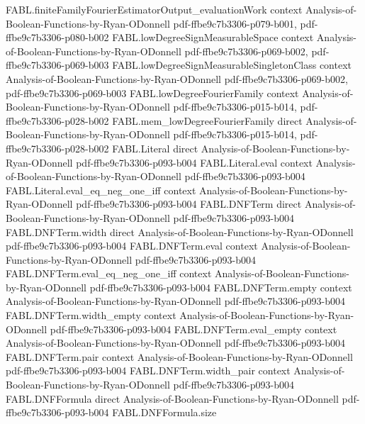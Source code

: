 \begin{theorem}
  {FABL.finiteFamilyFourierEstimatorOutput_evaluationWork}
  {context}
  {Analysis-of-Boolean-Functions-by-Ryan-ODonnell}
  {pdf-ffbe9c7b3306-p079-b001,
    pdf-ffbe9c7b3306-p080-b002}
\proofstep
  {FABL.lowDegreeSignMeasurableSpace}
  {context}
  {Analysis-of-Boolean-Functions-by-Ryan-ODonnell}
  {pdf-ffbe9c7b3306-p069-b002,
    pdf-ffbe9c7b3306-p069-b003}
\proofstep
  {FABL.lowDegreeSignMeasurableSingletonClass}
  {context}
  {Analysis-of-Boolean-Functions-by-Ryan-ODonnell}
  {pdf-ffbe9c7b3306-p069-b002,
    pdf-ffbe9c7b3306-p069-b003}
\proofstep
  {FABL.lowDegreeFourierFamily}
  {context}
  {Analysis-of-Boolean-Functions-by-Ryan-ODonnell}
  {pdf-ffbe9c7b3306-p015-b014,
    pdf-ffbe9c7b3306-p028-b002}
\proofstep
  {FABL.mem_lowDegreeFourierFamily}
  {direct}
  {Analysis-of-Boolean-Functions-by-Ryan-ODonnell}
  {pdf-ffbe9c7b3306-p015-b014,
    pdf-ffbe9c7b3306-p028-b002}
\proofstep
  {FABL.Literal}
  {direct}
  {Analysis-of-Boolean-Functions-by-Ryan-ODonnell}
  {pdf-ffbe9c7b3306-p093-b004}
\proofstep
  {FABL.Literal.eval}
  {context}
  {Analysis-of-Boolean-Functions-by-Ryan-ODonnell}
  {pdf-ffbe9c7b3306-p093-b004}
\proofstep
  {FABL.Literal.eval_eq_neg_one_iff}
  {context}
  {Analysis-of-Boolean-Functions-by-Ryan-ODonnell}
  {pdf-ffbe9c7b3306-p093-b004}
\proofstep
  {FABL.DNFTerm}
  {direct}
  {Analysis-of-Boolean-Functions-by-Ryan-ODonnell}
  {pdf-ffbe9c7b3306-p093-b004}
\proofstep
  {FABL.DNFTerm.width}
  {direct}
  {Analysis-of-Boolean-Functions-by-Ryan-ODonnell}
  {pdf-ffbe9c7b3306-p093-b004}
\proofstep
  {FABL.DNFTerm.eval}
  {context}
  {Analysis-of-Boolean-Functions-by-Ryan-ODonnell}
  {pdf-ffbe9c7b3306-p093-b004}
\proofstep
  {FABL.DNFTerm.eval_eq_neg_one_iff}
  {context}
  {Analysis-of-Boolean-Functions-by-Ryan-ODonnell}
  {pdf-ffbe9c7b3306-p093-b004}
\proofstep
  {FABL.DNFTerm.empty}
  {context}
  {Analysis-of-Boolean-Functions-by-Ryan-ODonnell}
  {pdf-ffbe9c7b3306-p093-b004}
\proofstep
  {FABL.DNFTerm.width_empty}
  {context}
  {Analysis-of-Boolean-Functions-by-Ryan-ODonnell}
  {pdf-ffbe9c7b3306-p093-b004}
\proofstep
  {FABL.DNFTerm.eval_empty}
  {context}
  {Analysis-of-Boolean-Functions-by-Ryan-ODonnell}
  {pdf-ffbe9c7b3306-p093-b004}
\proofstep
  {FABL.DNFTerm.pair}
  {context}
  {Analysis-of-Boolean-Functions-by-Ryan-ODonnell}
  {pdf-ffbe9c7b3306-p093-b004}
\proofstep
  {FABL.DNFTerm.width_pair}
  {context}
  {Analysis-of-Boolean-Functions-by-Ryan-ODonnell}
  {pdf-ffbe9c7b3306-p093-b004}
\proofstep
  {FABL.DNFFormula}
  {direct}
  {Analysis-of-Boolean-Functions-by-Ryan-ODonnell}
  {pdf-ffbe9c7b3306-p093-b004}
\proofstep
  {FABL.DNFFormula.size}

\end{theorem}
